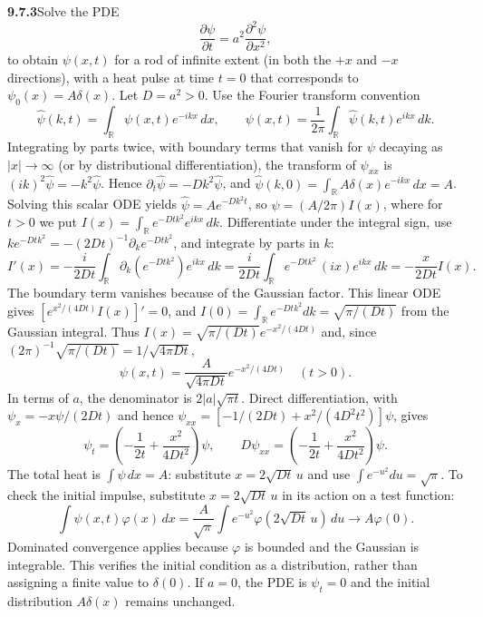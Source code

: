 \par\bigskip
\noindent\textbf{9.7.3}\quad Solve the PDE
\[
\frac{\partial\psi}{\partial t}=a^{2}\frac{\partial^{2}\psi}{\partial x^{2}},
\]
to obtain $\psi(x,t)$ for a rod of infinite extent (in both the $+x$ and $-x$
directions), with a heat pulse at time $t=0$ that corresponds to
$\psi_{0}(x)=A\delta(x)$.
\solution
Let $D=a^2>0$.  Use the Fourier transform convention
\[
\widehat\psi(k,t)=\int_{\mathbb R}\psi(x,t)e^{-ikx}\,dx,
\qquad
\psi(x,t)=\frac1{2\pi}\int_{\mathbb R}\widehat\psi(k,t)e^{ikx}\,dk.
\]
Integrating by parts twice, with boundary terms that vanish for $\psi$
decaying as $|x|\to\infty$ (or by distributional differentiation), the
transform of $\psi_{xx}$ is $(ik)^2\widehat\psi=-k^2\widehat\psi$.
Hence $\partial_t\widehat\psi=-Dk^2\widehat\psi$, and
$\widehat\psi(k,0)=\int_{\mathbb R}A\delta(x)e^{-ikx}\,dx=A$.
Solving this scalar ODE yields
$\widehat\psi=Ae^{-Dk^2t}$, so $\psi=(A/2\pi)I(x)$, where for $t>0$
we put $I(x)=\int_{\mathbb R}e^{-Dtk^2}e^{ikx}\,dk$.
Differentiate under the integral sign, use
$ke^{-Dtk^2}=-(2Dt)^{-1}\partial_k e^{-Dtk^2}$, and integrate by
parts in $k$:
\[
I'(x)=-\frac i{2Dt}\int_{\mathbb R}
 \partial_k(e^{-Dtk^2})e^{ikx}\,dk
=\frac i{2Dt}\int_{\mathbb R}e^{-Dtk^2}\,(ix)e^{ikx}\,dk
=-\frac{x}{2Dt}I(x).
\]
The boundary term vanishes because of the Gaussian factor.  This linear
ODE gives $[e^{x^2/(4Dt)}I(x)]'=0$, and
$I(0)=\int_{\mathbb R}e^{-Dtk^2}dk=\sqrt{\pi/(Dt)}$ from the
Gaussian integral.  Thus $I(x)=\sqrt{\pi/(Dt)}e^{-x^2/(4Dt)}$ and,
since $(2\pi)^{-1}\sqrt{\pi/(Dt)}=1/\sqrt{4\pi Dt}$,
\[
\boxed{\psi(x,t)=\frac{A}{\sqrt{4\pi Dt}}
 e^{-x^2/(4Dt)}\quad(t>0)}.
\]
In terms of $a$, the denominator is $2|a|\sqrt{\pi t}$.
Direct differentiation, with $\psi_x=-x\psi/(2Dt)$ and hence
$\psi_{xx}=[-1/(2Dt)+x^2/(4D^2t^2)]\psi$, gives
\[
\psi_t=\left(-\frac1{2t}+\frac{x^2}{4Dt^2}\right)\psi,
\qquad
D\psi_{xx}=\left(-\frac1{2t}+\frac{x^2}{4Dt^2}\right)\psi.
\]
The total heat is $\int\psi\,dx=A$: substitute $x=2\sqrt{Dt}\,u$ and
use $\int e^{-u^2}du=\sqrt\pi$.  To check the initial impulse,
substitute $x=2\sqrt{Dt}\,u$ in its action on a test function:
\[
\int\psi(x,t)\varphi(x)\,dx
=\frac A{\sqrt\pi}\int e^{-u^2}\varphi(2\sqrt{Dt}\,u)\,du
\longrightarrow A\varphi(0).
\]
Dominated convergence applies because $\varphi$ is bounded and the
Gaussian is integrable.  This verifies the initial condition as a
distribution, rather than assigning a finite value to $\delta(0)$.
If $a=0$, the PDE is $\psi_t=0$ and the initial distribution
$A\delta(x)$ remains unchanged.


